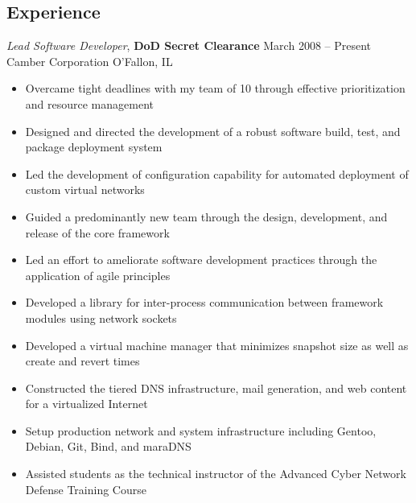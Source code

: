 \documentclass[margin,line]{resume}
\begin{document}
\begin{resume}
\section{Experience}

{\sl Lead Software Developer}, \textbf{\small DoD Secret Clearance}   \hfill  March 2008 -- Present\\
Camber Corporation                                                    \hfill  O'Fallon, IL
\begin{itemize} \itemsep -1pt %
\small\item Overcame tight deadlines with my team of 10 through effective prioritization and resource management
\small\item Designed and directed the development of a robust software build, test, and package deployment system
\small\item Led the development of configuration capability for automated deployment of custom virtual networks
\small\item Guided a predominantly new team through the design, development, and release of the core framework
\small\item Led an effort to ameliorate software development practices through the application of agile principles
\small\item Developed a library for inter-process communication between framework modules using network sockets
\small\item Developed a virtual machine manager that minimizes snapshot size as well as create and revert times
\small\item Constructed the tiered DNS infrastructure, mail generation, and web content for a virtualized Internet
\small\item Setup production network and system infrastructure including Gentoo, Debian, Git, Bind, and maraDNS
\small\item Assisted students as the technical instructor of the Advanced Cyber Network Defense Training Course


\end{itemize}
\end{resume}
\end{document}
